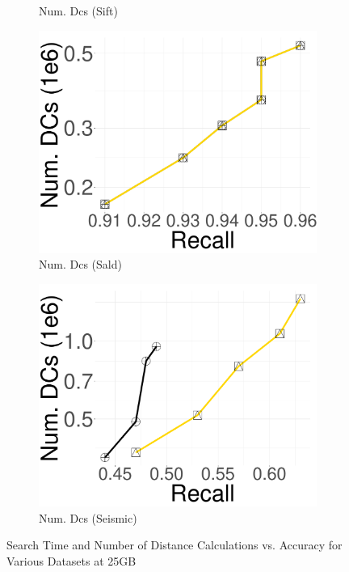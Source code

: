 \begin{figure}[htbp]
\begin{subfigure}[b]{0.2325\textwidth}
        \caption{Num. Dcs (Sift)}
        \label{fig:hnswdpa:25:25GB_Sift_DC}
    \end{subfigure}
    \begin{subfigure}[b]{0.2325\textwidth}
        \captionsetup{justification=centering}
	\centering	
        \includegraphics[width=\textwidth]{../img/oigas/PQVSPQS/25GB/sald_10_DC.pdf}
        \caption{Num. Dcs (Sald)}
        \label{fig:hnswdpa:25:25GB_Sald_DC}
    \end{subfigure}
    \begin{subfigure}[b]{0.2325\textwidth}
        \captionsetup{justification=centering}
	\centering	
        \includegraphics[width=\textwidth]{../img/oigas/PQVSPQS/25GB/seismic_10_DC.pdf}
        \caption{Num. Dcs (Seismic)}
        \label{fig:hnswdpa:25:25GB_Seismic_DC}
    \end{subfigure}
    \caption{Search Time and Number of Distance Calculations vs. Accuracy for Various Datasets at 25GB}
    \label{fig:hnswdpa:25}
\end{figure}
